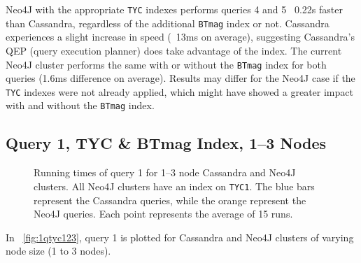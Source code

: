 Neo4J with the appropriate \texttt{TYC} indexes performs queries 4 and 5 ~0.22s faster than Cassandra, regardless of
the additional \texttt{BTmag} index or not.
Cassandra experiences a slight increase in speed (~13ms on average), suggesting Cassandra's QEP (query execution
planner) does take advantage of the index.
The current Neo4J cluster performs the same with or without the \texttt{BTmag} index for both queries (1.6ms difference
on average).
Results may differ for the Neo4J case if the \texttt{TYC} indexes were not already applied, which might have showed
a greater impact with and without the \texttt{BTmag} index.

\subsection{Query 1, TYC \& BTmag Index, 1--3 Nodes}\label{subsec:queries1,2,TycbtmagIndex,1-3Nodes}
\begin{figure}
    \caption{Running times of query 1 for 1--3 node Cassandra and Neo4J clusters.
    All Neo4J clusters have an index on \texttt{TYC1}.
    The blue bars represent the Cassandra queries, while the orange represent the Neo4J queries.
    Each point represents the average of 15 runs.}\label{fig:1qtyc123}
\end{figure}

In ~\autoref{fig:1qtyc123}, query 1 is plotted for Cassandra and Neo4J clusters of varying node size (1 to 3 nodes).


